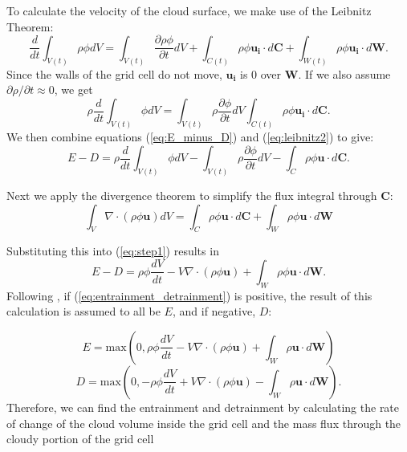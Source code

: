 \documentclass[acp]{copernicus}
\begin{document}
To calculate the velocity of the cloud surface, we make use of the Leibnitz 
Theorem:
\begin{equation}
\label{eq:leibnitz} 
\frac{d}{dt}\int_{V(t)} \rho \phi dV = 
  \int_{V(t)} \frac{\partial \rho \phi}{ \partial t} dV 
  + \int_{C(t)} \rho \phi \mathbf{u_i}\cdot d\mathbf{C}
  + \int_{W(t)} \rho \phi \mathbf{u_i}\cdot d\mathbf{W}.
\end{equation}
Since the walls of the grid cell do not move, $\mathbf{u_i}$ is 0 over 
$\mathbf{W}$.  If we also assume ${\partial \rho}/{ \partial t} \approx 0$, we
get
\begin{equation}
\label{eq:leibnitz2} 
    \rho \frac{d}{dt}\int_{V(t)} \phi dV = 
    \int_{V(t)} \rho \frac{\partial \phi}{ \partial t} dV 
    \int_{C(t)} \rho \phi \mathbf{u_i}\cdot d\mathbf{C}.
\end{equation}
We then combine equations (\ref{eq:E_minus_D}) and (\ref{eq:leibnitz2}) to give:
\begin{equation}
\label{eq:step1} 
      E - D = \rho \frac{d}{dt}\int_{V(t)} \phi dV
            - \int_{V(t)} \rho \frac{\partial \phi}{ \partial t} dV 
            - \int_C \rho \phi \mathbf{u} \cdot d\mathbf{C}.
\end{equation}

Next we apply the divergence theorem to simplify the flux integral through 
$\mathbf{C}$:
\begin{equation}
\label{eq:divergence} 
\int_{V} \nabla \cdot (\rho \phi \mathbf{u}) dV = 
  \int_{C} \rho \phi \mathbf{u}\cdot d\mathbf{C}
+ \int_{W} \rho \phi \mathbf{u}\cdot d\mathbf{W}
\end{equation}

Substituting this into (\ref{eq:step1}) results in
 \begin{equation}
\label{eq:entrainment_detrainment} 
E - D = \rho \phi \frac{dV}{dt} 
  - V \nabla \cdot (\rho \phi \mathbf{u})
  + \int_W \rho \phi \mathbf{u} \cdot d\mathbf{W}.
\end{equation}
Following \cite{Romps2010}, if (\ref{eq:entrainment_detrainment}) is positive,
the result of this calculation is assumed to all be $E$, and if negative, $D$: 

\begin{equation}
\label{eq:max_ent} 
E = \mathrm{max}\left(0, 
    \rho \phi \frac{dV}{dt}
  - V \nabla \cdot (\rho \phi \mathbf{u})
  + \int_W \rho \mathbf{u} \cdot d\mathbf{W}\right)
\end{equation}
\begin{equation}
\label{eq:max_det} 
D = \mathrm{max}\left(0, 
  - \rho \phi \frac{dV}{dt} 
  + V \nabla \cdot (\rho \phi \mathbf{u})
  - \int_W \rho \mathbf{u} \cdot d\mathbf{W}\right).
\end{equation}
Therefore, we can find the entrainment and detrainment by calculating the rate 
of change of the cloud volume inside the grid cell and the mass flux through 
the cloudy portion of the grid cell 
\end{document}
